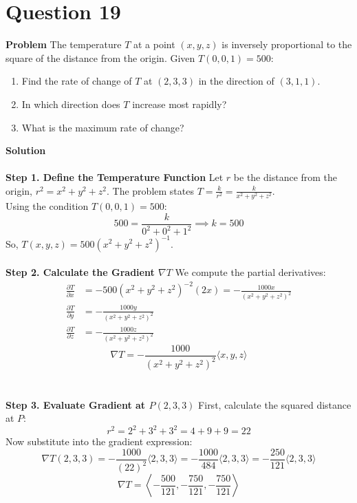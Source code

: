 \documentclass{article}
\begin{document}
\pagebreak


\section{Question 19}
\textbf{Problem}
The temperature $T$ at a point $(x,y,z)$ is inversely proportional to the square
of the distance from the origin.
Given $T(0,0,1)=500$:
\begin{enumerate}
	\item Find the rate of change of $T$ at $(2,3,3)$ in the direction of $(3,1,1)$.
	\item In which direction does $T$ increase most rapidly?
	\item What is the maximum rate of change?
\end{enumerate}
\textbf{Solution}
\\
\\
\textbf{Step 1. Define the Temperature Function}
Let $r$ be the distance from the origin, $r^2 = x^2 + y^2 + z^2$.
The problem states $T = \frac{k}{r^2} = \frac{k}{x^2+y^2+z^2}$.
\\
Using the condition $T(0,0,1) = 500$:
\[
	500 = \frac{k}{0^2 + 0^2 + 1^2} \implies k = 500
\]
So, $T(x,y,z) = 500(x^2 + y^2 + z^2)^{-1}$.
\\
\\
\textbf{Step 2. Calculate the Gradient $\nabla T$}
We compute the partial derivatives:
\begin{align*}
	\frac{\partial T}{\partial x} & = -500(x^2+y^2+z^2)^{-2}(2x) = -\frac{1000x}{(x^2+y^2+z^2)^2} \\
	\frac{\partial T}{\partial y} & = -\frac{1000y}{(x^2+y^2+z^2)^2}                              \\
	\frac{\partial T}{\partial z} & = -\frac{1000z}{(x^2+y^2+z^2)^2}
\end{align*}
\[
	\nabla T = -\frac{1000}{(x^2+y^2+z^2)^2} \langle x, y, z \rangle
\]
\\
\\
\textbf{Step 3. Evaluate Gradient at $P(2,3,3)$}
First, calculate the squared distance at $P$:
\[
	r^2 = 2^2 + 3^2 + 3^2 = 4 + 9 + 9 = 22
\]
Now substitute into the gradient expression:
\[
	\nabla T(2,3,3) = -\frac{1000}{(22)^2} \langle 2, 3, 3 \rangle = -\frac{1000}{484} \langle 2, 3, 3 \rangle = -\frac{250}{121} \langle 2, 3, 3 \rangle
\]
\[
	\nabla T = \left\langle -\frac{500}{121}, -\frac{750}{121}, -\frac{750}{121} \right\rangle
\]
\\
\\
\end{document}
